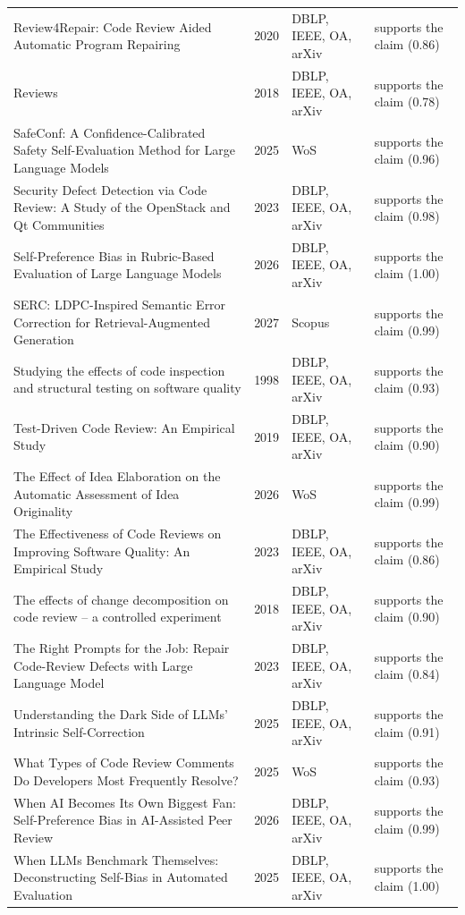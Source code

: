 \begin{longtable}{@{}%
  >{\raggedright\arraybackslash}p{}c%
  >{\raggedright\arraybackslash}p{}%
  >{\raggedright\arraybackslash}p{}@{}}
Review4Repair: Code Review Aided Automatic Program Repairing & 2020 & DBLP, IEEE, OA, arXiv & supports the claim (0.86) \\
Reviews & 2018 & DBLP, IEEE, OA, arXiv & supports the claim (0.78) \\
SafeConf: A Confidence-Calibrated Safety Self-Evaluation Method for Large Language Models & 2025 & WoS & supports the claim (0.96) \\
Security Defect Detection via Code Review: A Study of the OpenStack and Qt Communities & 2023 & DBLP, IEEE, OA, arXiv & supports the claim (0.98) \\
Self-Preference Bias in Rubric-Based Evaluation of Large Language Models & 2026 & DBLP, IEEE, OA, arXiv & supports the claim (1.00) \\
SERC: LDPC-Inspired Semantic Error Correction for Retrieval-Augmented Generation & 2027 & Scopus & supports the claim (0.99) \\
Studying the effects of code inspection and structural testing on software quality & 1998 & DBLP, IEEE, OA, arXiv & supports the claim (0.93) \\
Test-Driven Code Review: An Empirical Study & 2019 & DBLP, IEEE, OA, arXiv & supports the claim (0.90) \\
The Effect of Idea Elaboration on the Automatic Assessment of Idea Originality & 2026 & WoS & supports the claim (0.99) \\
The Effectiveness of Code Reviews on Improving Software Quality: An Empirical Study & 2023 & DBLP, IEEE, OA, arXiv & supports the claim (0.86) \\
The effects of change decomposition on code review -- a controlled experiment & 2018 & DBLP, IEEE, OA, arXiv & supports the claim (0.90) \\
The Right Prompts for the Job: Repair Code-Review Defects with Large Language Model & 2023 & DBLP, IEEE, OA, arXiv & supports the claim (0.84) \\
Understanding the Dark Side of LLMs' Intrinsic Self-Correction & 2025 & DBLP, IEEE, OA, arXiv & supports the claim (0.91) \\
What Types of Code Review Comments Do Developers Most Frequently Resolve? & 2025 & WoS & supports the claim (0.93) \\
When AI Becomes Its Own Biggest Fan: Self-Preference Bias in AI-Assisted Peer Review & 2026 & DBLP, IEEE, OA, arXiv & supports the claim (0.99) \\
When LLMs Benchmark Themselves: Deconstructing Self-Bias in Automated Evaluation & 2025 & DBLP, IEEE, OA, arXiv & supports the claim (1.00) \\

\end{longtable}
